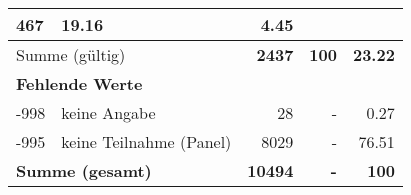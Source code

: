 \begin{longtable}{lXrrr}
       \num{467} &
       \num[round-mode=places,round-precision=2]{19,16} &
         \num[round-mode=places,round-precision=2]{4,45} \\
     \midrule
     \multicolumn{2}{l}{Summe (gültig)} &
       \textbf{\num{2437}} &
     \textbf{100} &
       \textbf{\num[round-mode=places,round-precision=2]{23,22}} \\
     \multicolumn{5}{l}{\textbf{Fehlende Werte}}\\
       -998 &
       keine Angabe &
         \num{28} &
        - &
         \num[round-mode=places,round-precision=2]{0,27} \\
       -995 &
       keine Teilnahme (Panel) &
         \num{8029} &
        - &
         \num[round-mode=places,round-precision=2]{76,51} \\
     \midrule
     \multicolumn{2}{l}{\textbf{Summe (gesamt)}} &
          \textbf{\num{10494}} &
        \textbf{-} &
        \textbf{100} \\
     \bottomrule
     \end{longtable}
     
